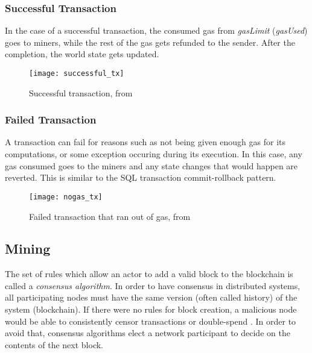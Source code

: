\subsubsection{Successful Transaction}
In the case of a successful transaction, the consumed gas from \textit{gasLimit} (\textit{gasUsed}) goes to miners, while the rest of the gas gets refunded to the sender. After the completion, the world state gets updated.

\begin{figure}[H]
    \centering
    \texttt{[image: successful\_tx]}
    \caption{Successful transaction, from \cite{preethi}}
    \label{fig:successful_tx}
\end{figure}

\subsubsection{Failed Transaction}
A transaction can fail for reasons such as not being given enough gas for its computations, or some exception occuring during its execution. In this case, any gas consumed goes to the miners and any state changes that would happen are reverted. This is similar to the SQL transaction commit-rollback pattern.

\begin{figure}[H]
    \centering
    \texttt{[image: nogas\_tx]}
    \caption{Failed transaction that ran out of gas, from \cite{preethi}}
    \label{fig:nogas_tx}
\end{figure}

\subsection{Mining}
The set of rules which allow an actor to add a valid block to the blockchain is called a \textit{consensus algorithm}. In order to have consensus in distributed systems, all participating nodes must have the same version (often called history) of the system (blockchain). If there were no rules for block creation, a malicious node would be able to consistently censor transactions or double-spend \cite{doublespend}. In order to avoid that, consensus algorithms elect a network participant to decide on the contents of the next block. 

